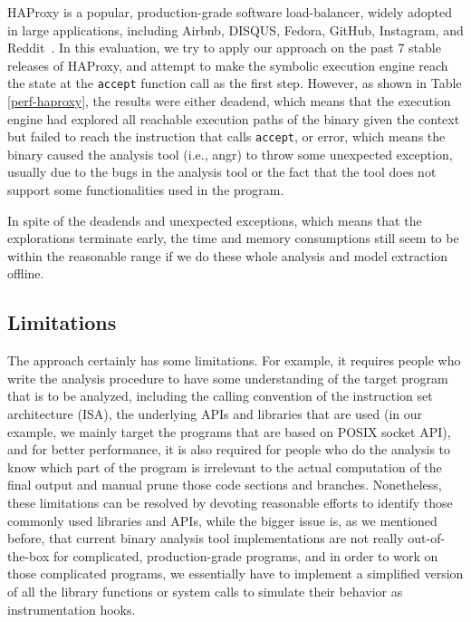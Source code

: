 HAProxy is a popular, production-grade software load-balancer, widely adopted in
large applications, including Airbnb, DISQUS, Fedora, GitHub, Instagram, and
Reddit~\cite{haproxy-they-use-it}. In this evaluation, we try to apply our
approach on the past 7 stable releases of HAProxy, and attempt to make the
symbolic execution engine reach the state at the \texttt{accept} function call
as the first step. However, as shown in Table \ref{perf-haproxy}, the results
were either deadend, which means that the execution engine had explored all
reachable execution paths of the binary given the context but failed to reach
the instruction that calls \texttt{accept}, or error, which means the binary
caused the analysis tool (i.e., angr) to throw some unexpected exception,
usually due to the bugs in the analysis tool or the fact that the tool does not
support some functionalities used in the program.

In spite of the deadends and unexpected exceptions, which means that the
explorations terminate early, the time and memory consumptions still seem to be
within the reasonable range if we do these whole analysis and model extraction
offline.


\subsection{Limitations}

The approach certainly has some limitations. For example, it requires people who
write the analysis procedure to have some understanding of the target program
that is to be analyzed, including the calling convention of the instruction set
architecture (ISA), the underlying APIs and libraries that are used (in our
example, we mainly target the programs that are based on POSIX socket API), and
for better performance, it is also required for people who do the analysis to
know which part of the program is irrelevant to the actual computation of the
final output and manual prune those code sections and branches. Nonetheless,
these limitations can be resolved by devoting reasonable efforts to identify
those commonly used libraries and APIs, while the bigger issue is, as we
mentioned before, that current binary analysis tool implementations are not
really out-of-the-box for complicated, production-grade programs, and in order
to work on those complicated programs, we essentially have to implement a
simplified version of all the library functions or system calls to simulate
their behavior as instrumentation hooks.


